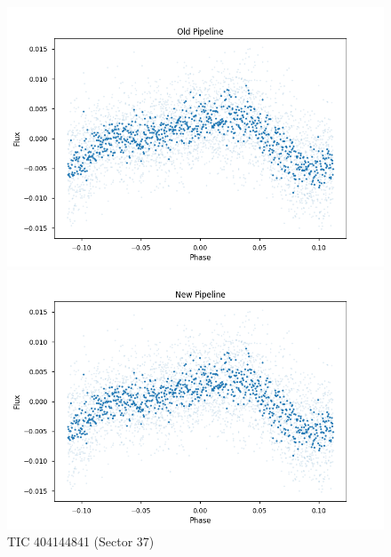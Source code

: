 \documentclass{article}
\begin{document}
\begin{figure}[h!]
    \centering
    \begin{minipage}{0.45\textwidth}
        \centering
        \includegraphics[width=\textwidth]{./figures/10_old.png}
    \end{minipage}%
    \hfill
    \begin{minipage}{0.45\textwidth}
        \centering
        \includegraphics[width=\textwidth]{./figures/10_new.png}
    \end{minipage}
    \caption{TIC 404144841 (Sector 37)}
\end{figure}
\end{document}
